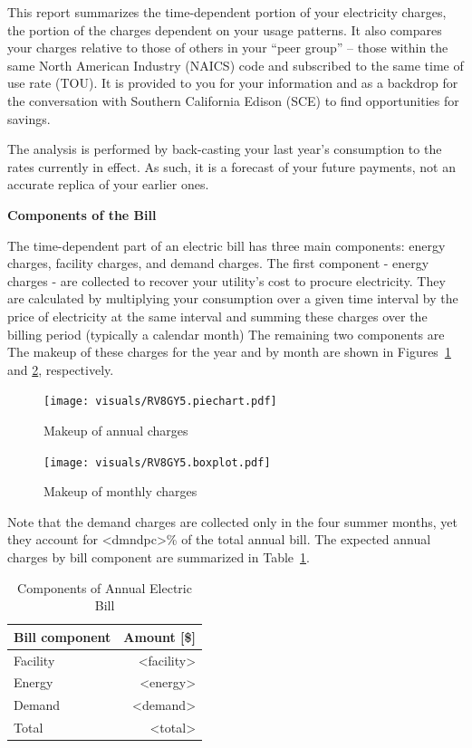 \documentclass[11pt]{article}
\begin{document}
\pagestyle{title}
This report summarizes the time-dependent portion of your electricity charges, the portion of the charges dependent on your usage patterns. It also compares your charges relative to those of others in your ``peer group'' -- those within the same North American Industry (NAICS) code and subscribed to the same time of use rate (TOU). It is provided to you for your information and as a backdrop for the conversation with Southern California Edison (SCE) to find opportunities for savings.

The analysis is performed by back-casting your last year's consumption to the rates currently in effect. As such, it is a forecast of your future payments, not an accurate replica of your earlier ones. 

\vspace{3ex}
\textbf{\Large Components of the Bill}
\vspace{1ex}

The time-dependent part of an electric bill has three main components: energy charges, facility charges, and demand charges. The first component - energy charges - are collected to recover your utility's cost to procure electricity. They are calculated by multiplying your consumption over a given time interval by the price of electricity at the same interval and summing these charges over the billing period (typically a calendar month) The remaining two components are  The makeup of these charges for the year and by month are shown in Figures~\ref{fig:pie} and \ref{fig:bars}, respectively.
\begin{figure}[!h]
\centering
\texttt{[image: visuals/RV8GY5.piechart.pdf]}
\caption{Makeup of annual charges}
\label{fig:pie}
\end{figure}

\begin{figure}[!h]
\centering
\texttt{[image: visuals/RV8GY5.boxplot.pdf]}
\caption{Makeup of monthly charges}
\label{fig:bars}
\end{figure}

Note that the demand charges are collected only in the four summer months, yet they account for <dmndpc>\% of the total annual bill. The expected annual charges by bill component are summarized in Table~\ref{tab:annual}.

\begin{table}[th!]
  \centering
  \caption{Components of Annual Electric Bill}
  \vspace{1.5ex}
  \label{tab:annual}
  \begin{tabular}{lr}
    Bill component & Amount [\$] \\
    \midrule
    Facility & <facility> \\
    Energy & <energy> \\
    Demand & <demand> \\
    \midrule
    Total & <total>
  \end{tabular}
\end{table}
\clearpage
\end{document}
